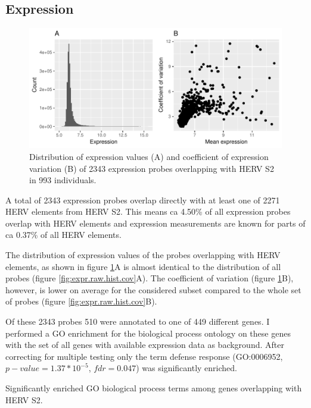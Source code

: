 \documentclass[a4paper,12pt,twoside,openright]{report}
\begin{document}
\subsection{Expression}
\label{Results:Expression}

\begin{figure}[tb]
	\includegraphics[scale = 1, keepaspectratio = true]{../figures/hervS2_expr_raw_hist_cov}  
	\caption{Distribution of expression values (A) and coefficient of expression variation (B) of 2343 expression probes overlapping with HERV S2 in 993 individuals.}
    \label{fig:hervS2.expr.hist.cov}
\end{figure}

A total of 2343 expression probes overlap directly with at least one of 2271 HERV elements from HERV S2. This means ca 4.50\% of all expression probes overlap with HERV elements and expression measurements are known for parts of ca 0.37\% of all HERV elements.

The distribution of expression values of the probes overlapping with HERV elements, as shown in figure \ref{fig:hervS2.expr.hist.cov}A is almost identical to the distribution of all probes (figure \ref{fig:expr.raw.hist.cov}A). The coefficient of variation (figure \ref{fig:hervS2.expr.hist.cov}B), however, is lower on average for the considered subset compared to the whole set of probes (figure \ref{fig:expr.raw.hist.cov}B).

Of these 2343 probes 510 were annotated to one of 449 different genes. I performed a GO enrichment for the biological process ontology on these genes with the set of all genes with available expression data as background. After correcting for multiple testing only the term defense response (GO:0006952, $p-value=1.37*10^{-5}$, $fdr=0.047$) was significantly enriched.

\begin{table}[h!]
  \begin{center}
  \end{center}        
	\caption{Significantly enriched GO biological process terms among genes overlapping with HERV S2.}
	\label{tab:hervS2.2kb.expr.enrichment}
\end{table}
\end{document}
